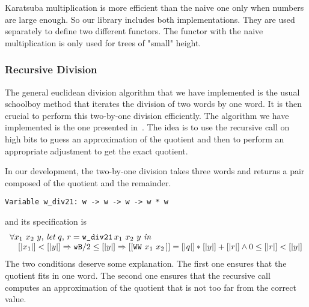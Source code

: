 Karatsuba multiplication is more efficient than the naive one
only when numbers are large enough. So our library
includes both implementations. They are used separately to define two
different functors. The functor with the naive multiplication is only used 
for trees of "small" height. 

\subsubsection{Recursive Division}
The general euclidean division algorithm that we have implemented is the usual schoolboy 
method that iterates the division of two words by one word. 
It is then crucial to perform this two-by-one division efficiently. 
The algorithm we have implemented is the one presented in~\cite{RecDiv}.
The idea is to use the recursive call on high bits to guess an approximation 
of the quotient and  then to perform an appropriate adjustment to get the exact quotient.

In our development, the two-by-one division takes
three words and returns a pair composed of the quotient and the remainder.
\begin{verbatim}
Variable w_div21: w -> w -> w -> w * w
\end{verbatim}
and its specification is 
$$\begin{array}{l}
\forall x_1\,\, x_2\,\, y,\, \textit{let}\,\, q,\, r = \texttt{w\_div21}\, x_1\,\, x_2\,\, y\,\, \textit{in}\,\, \\
\hskip10pt [|x_1|] < [|y|] \Rightarrow {\texttt{wB}} / 2 \le [|y|] \Rightarrow  [[\texttt{WW}\,\,x_1\,\,x_2\,]] = [|q|] * [|y|] + [|r|] \land 0 \le [|r|] < [|y|]
\end{array}
$$
The two conditions deserve some explanation.
The first one ensures that the quotient fits in one word.
The second one %
ensures that the recursive call computes an approximation 
of the quotient that is not too far from the correct value.

